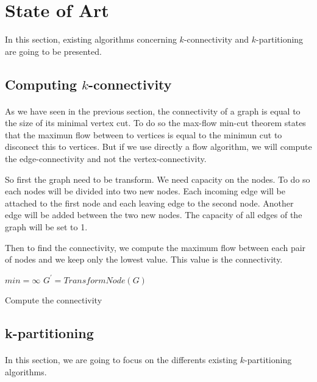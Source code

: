 \section{State of Art}
In this section, existing algorithms concerning $k$-connectivity and $k$-partitioning are going to be presented.

\subsection{Computing $k$-connectivity}
\paragraph{}
As we have seen in the previous section, the connectivity of a graph is equal to
the size of its minimal vertex cut.
To do so the max-flow min-cut theorem states that the maximun flow between to
vertices is equal to the minimun cut to disconect this to vertices.
But if we use directly a flow algorithm, we will compute the edge-connectivity
and not the vertex-connectivity.

So first the graph need to be transform. We need capacity on the nodes. To do so
each nodes will be divided into two new nodes. Each incoming edge will be
attached to the first node and each leaving edge to the second node. Another
edge will be added between the two new nodes.
The capacity of all edges of the graph will be set to 1.

Then to find the connectivity, we compute the maximum flow between each pair of
nodes and we keep only the lowest value. This value is the connectivity.


\begin{algorithm}[!h]
    $min = \infty$\;
    $G^{'} = TransformNode(G)$\;
    \;
    \caption{Compute the connectivity}
\end{algorithm}

\subsection{k-partitioning}
\paragraph{}
In this section, we are going to focus on the differents existing
$k$-partitioning algorithms.


